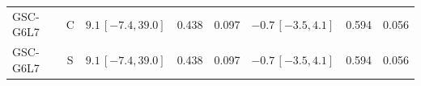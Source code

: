 \begin{longtable}{lcp{37mm}rrp{37mm}rr}
GSC-G6L7 & C & \(9.1\,[-7.4,39.0]\) & 0.438 & 0.097 & \(-0.7\,[-3.5,4.1]\) & 0.594 & 0.056\\
GSC-G6L7 & S & \(9.1\,[-7.4,39.0]\) & 0.438 & 0.097 & \(-0.7\,[-3.5,4.1]\) & 0.594 & 0.056\\

\end{longtable}
